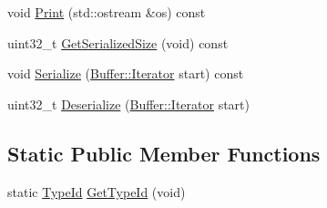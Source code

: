 \begin{DoxyCompactItemize}
\item 
void \hyperlink{classns3_1_1OfdmDownlinkFramePrefix_a4a27657052480e2ea361f3b3dff8a998}{Print} (std\+::ostream \&os) const 
\item 
uint32\+\_\+t \hyperlink{classns3_1_1OfdmDownlinkFramePrefix_abab3082b79a2000370268e9d60735aa1}{Get\+Serialized\+Size} (void) const 
\item 
void \hyperlink{classns3_1_1OfdmDownlinkFramePrefix_a8347d0fd9a7ca40b2a4fbe004400f44c}{Serialize} (\hyperlink{classns3_1_1Buffer_1_1Iterator}{Buffer\+::\+Iterator} start) const 
\item 
uint32\+\_\+t \hyperlink{classns3_1_1OfdmDownlinkFramePrefix_af73288c0b2ca162f5006cfc44b27e762}{Deserialize} (\hyperlink{classns3_1_1Buffer_1_1Iterator}{Buffer\+::\+Iterator} start)
\end{DoxyCompactItemize}
\subsection*{Static Public Member Functions}
\begin{DoxyCompactItemize}
\item 
static \hyperlink{classns3_1_1TypeId}{Type\+Id} \hyperlink{classns3_1_1OfdmDownlinkFramePrefix_a5cd0c451be765df81fa44e220a42d409}{Get\+Type\+Id} (void)
\end{DoxyCompactItemize}
